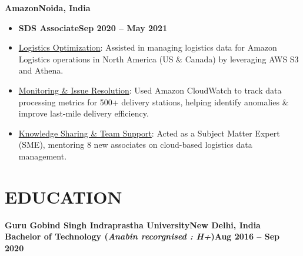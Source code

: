 \documentclass[11pt,a4paper]{article}
\newenvironment{dashlist}{
  \begin{itemize}[label={--}]
}{
  \end{itemize}
}
\begin{document}
\noindent\textbf{Amazon\hfill Noida, India}
\begin{itemize}
\item \textbf{SDS Associate\hfill Sep 2020 – May 2021}
\end{itemize}
\begin{dashlist}
    \item \uline {Logistics Optimization}: Assisted in managing logistics data for Amazon Logistics operations in North America (US \& Canada) by leveraging AWS S3 and Athena.
    \item \uline {Monitoring \& Issue Resolution}: Used Amazon CloudWatch to track data processing metrics for 500+ delivery stations, helping identify anomalies \& improve last-mile delivery efficiency.
    \item \uline {Knowledge Sharing \& Team Support}: Acted as a Subject Matter Expert (SME), mentoring 8 new associates on cloud-based logistics data management.
\end{dashlist}

\section*{EDUCATION}
\noindent\textbf{Guru Gobind Singh Indraprastha University\hfill New Delhi, India\\
Bachelor of Technology (\textit{Anabin recorgnised : H+})\hfill Aug 2016 – Sep 2020}
\end{document}
